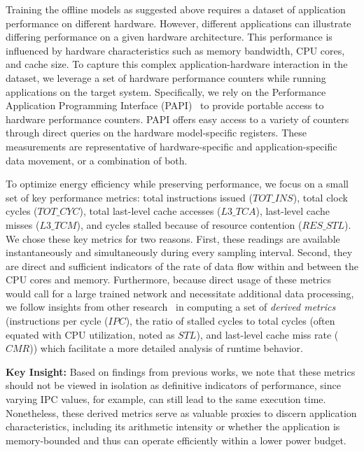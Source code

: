 Training the offline models as suggested above requires a dataset of application performance
on different hardware. However, 
different applications can illustrate differing performance on a given hardware architecture.
This performance is influenced by hardware characteristics such
as memory bandwidth, CPU cores, and cache size. To capture this complex
application-hardware interaction in the dataset, we leverage a set of hardware performance
counters while running applications on the target system. Specifically, we rely on the
Performance Application Programming Interface (PAPI)~\cite{mucci1999papi} to provide portable access to hardware performance counters.  PAPI offers easy access to a variety of counters through direct queries on the hardware model-specific registers. These measurements are representative of hardware-specific and application-specific data movement, or a combination of both.

To optimize energy efficiency while preserving performance, we focus on a small set of key performance metrics: total instructions issued ($TOT\_INS$), total clock cycles ($TOT\_CYC$), total last-level cache accesses ($L3\_TCA$), last-level cache misses ($L3\_TCM$), and cycles stalled because of resource contention ($RES\_STL$). We chose these key metrics for two reasons. First, these readings are available instantaneously and simultaneously during every sampling interval. Second, they are direct and sufficient indicators of the rate of data flow within and between the CPU cores and memory. Furthermore, because direct usage of these metrics would call for a large trained network and necessitate additional data processing, we follow insights from other research~\cite{wittmann2016chip,rane2014enhancing} in computing a set of \textit{derived metrics} (instructions per cycle ($IPC$), the ratio of stalled cycles to total cycles (often equated with CPU utilization, noted as $STL$), and last-level cache miss rate ($CMR$)) which facilitate a more detailed analysis of runtime behavior.  

\textbf{Key Insight:} Based on findings from previous works, we note that these metrics should not be viewed in isolation as definitive indicators of performance, since varying IPC values, for example, can still lead to the same execution time. Nonetheless, these derived metrics serve as valuable proxies to discern application characteristics, including its arithmetic intensity or whether the application is memory-bounded and thus can operate efficiently within a lower power budget.

